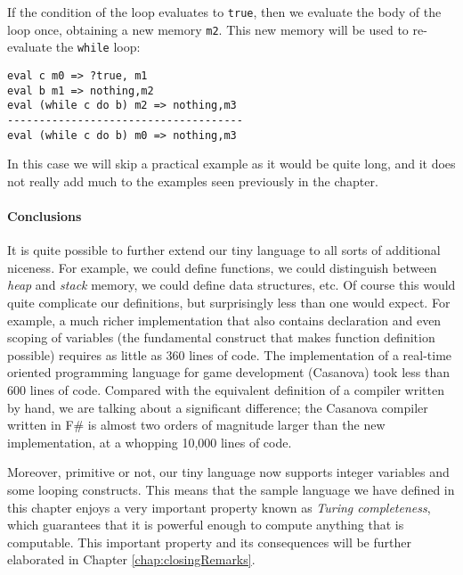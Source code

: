 If the condition of the loop evaluates to \texttt{true}, then we evaluate the body of the loop once, obtaining a new memory \texttt{m2}. This new memory will be used to re-evaluate the \texttt{while} loop:

\begin{lstlisting}
eval c m0 => ?true, m1
eval b m1 => nothing,m2
eval (while c do b) m2 => nothing,m3
-------------------------------------
eval (while c do b) m0 => nothing,m3
\end{lstlisting}

In this case we will skip a practical example as it would be quite long, and it does not really add much to the examples seen previously in the chapter.

\paragraph{Conclusions}
It is quite possible to further extend our tiny language to all sorts of additional niceness. For example, we could define functions, we could distinguish between \textit{heap} and \textit{stack} memory, we could define data structures, etc. Of course this would quite complicate our definitions, but surprisingly less than one would expect. For example, a much richer implementation that also contains declaration and even scoping of variables (the fundamental construct that makes function definition possible) requires as little as 360 lines of code. The implementation of a real-time oriented programming language for game development (Casanova) took less than 600 lines of code. Compared with the equivalent definition of a compiler written by hand, we are talking about a significant difference; the Casanova compiler written in F\# is almost two orders of magnitude larger than the new implementation, at a whopping 10,000 lines of code.

Moreover, primitive or not, our tiny language now supports integer variables and some looping constructs. This means that the sample language we have defined in this chapter enjoys a very important property known as \textit{Turing completeness}, which guarantees that it is powerful enough to compute anything that is computable. This important property and its consequences will be further elaborated in Chapter \ref{chap:closingRemarks}.
